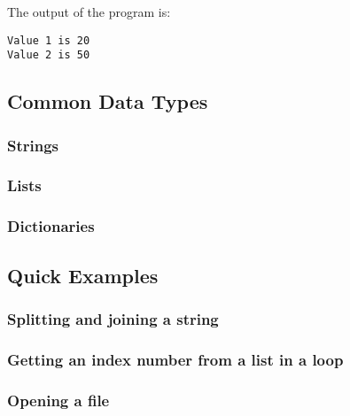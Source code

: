 \documentclass[12pt]{article}
\begin{document}
The output of the program is:

\begin{verbatim}
Value 1 is 20
Value 2 is 50
\end{verbatim}

\subsection*{Common Data Types}

\subsubsection*{Strings}

\subsubsection*{Lists}

\subsubsection*{Dictionaries}





\subsection*{Quick Examples}


\subsubsection*{Splitting and joining a string}


\subsubsection*{Getting an index number from a list in a loop}

\subsubsection*{Opening a file}
\end{document}
